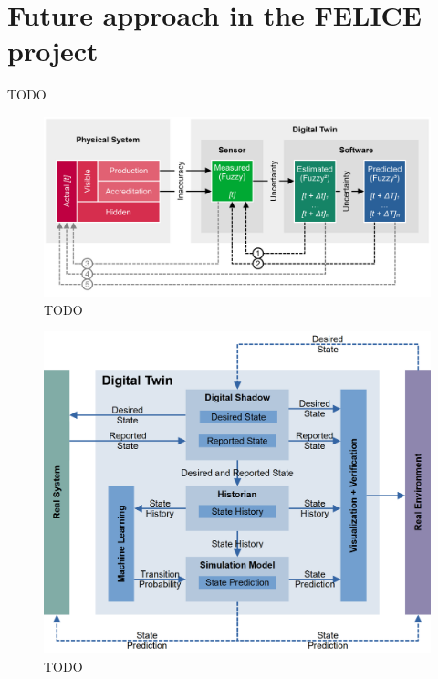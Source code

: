 \documentclass[9pt,conference]{IEEEtran}
\begin{document}
    \section{Future approach in the FELICE project}
    \label{section:framework_1}
    TODO

    \begin{figure}[htbp]
        \includegraphics[width=\columnwidth]{Digital Twin Deviation.png}
        \caption{TODO}
        \label{todo-2}
    \end{figure}

    \begin{figure}[htbp]
        \includegraphics[width=\columnwidth]{Digital Twin.png}
        \caption{TODO}
        \label{todo-1}
    \end{figure}
\end{document}
